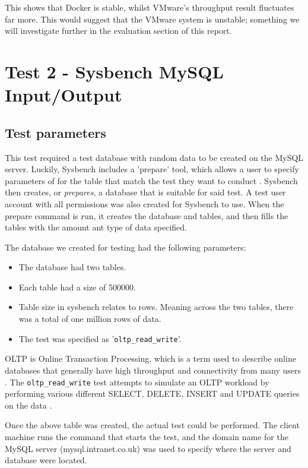 This shows that Docker is stable, whilst VMware's throughput result fluctuates far more. This would suggest that the VMware system is unstable; something we will investigate further in the evaluation section of this report.

\section{Test 2 - Sysbench MySQL Input/Output}
\subsection{Test parameters}
This test required a test database with random data to be created on the MySQL server. Luckily, Sysbench includes a 'prepare' tool, which allows a user to specify parameters of for the table that match the test they want to conduct \citep{sysbench}. Sysbench then creates, or \emph{prepares}, a database that is suitable for said test. A test user account with all permissions was also created for Sysbench to use. When the prepare command is run, it creates the database and tables, and then fills the tables with the amount ant type of data specified.

The database we created for testing had the following parameters:
\begin{itemize}
  \item The database had two tables.
  \item Each table had a size of 500000.
  \item Table size in sysbench relates to rows. Meaning across the two tables, there was a total of one million rows of data.
  \item The test was specified as '\texttt{oltp\_read\_write}'.
\end{itemize}

OLTP is Online Transaction Processing\citep{oltp}, which is a term used to describe online databases that generally have high throughput and connectivity from many users \citep{oracleoltp}. The \texttt{oltp\_read\_write} test attempts to simulate an OLTP workload by performing various different SELECT, DELETE, INSERT and UPDATE queries on the data \citep{sysbenchmarking}.

Once the above table was created, the actual test could be performed. The client machine runs the command that starts the test, and the domain name for the MySQL server (mysql.intranet.co.uk) was used to specify where the server and database were located.

